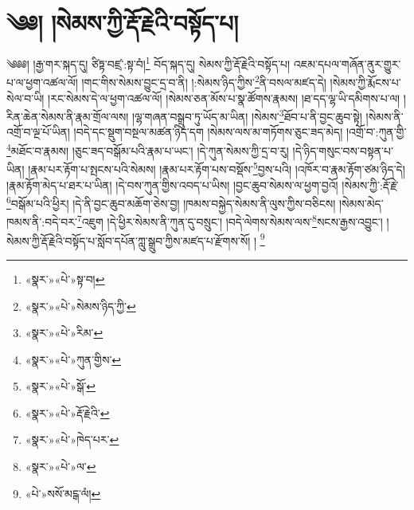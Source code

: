 \chapter{༄༅། །སེམས་ཀྱི་རྡོ་རྗེའི་བསྟོད་པ།}༄༅༅། །རྒྱ་གར་སྐད་དུ། ཙིཏྟ་བཛྲ་:སྟ་བཾ།\footnote{«སྣར་»«པེ་»སྟ་བ།} བོད་སྐད་དུ། སེམས་ཀྱི་རྡོ་རྗེའི་བསྟོད་པ། འཇམ་དཔལ་གཞོན་ནུར་གྱུར་པ་ལ་ཕྱག་འཚལ་ལོ། །གང་གིས་སེམས་བྱུང་དྲ་བ་ནི། །:སེམས་ཉིད་ཀྱིས་\footnote{«སྣར་»«པེ་»སེམས་ཉིད་ཀྱི་}ནི་བསལ་མཛད་དེ། །སེམས་ཀྱི་རྨོངས་པ་སེལ་བ་ཡི། །རང་སེམས་དེ་ལ་ཕྱག་འཚལ་ལོ། །སེམས་ཅན་མོས་པ་སྣ་ཚོགས་རྣམས། །ཐ་དད་ལྷ་ཡི་དམིགས་པ་ལ། །རིན་ཆེན་སེམས་ནི་རྣམ་གྲོལ་ལས། །ལྷ་གཞན་བསྒྲུབ་ཏུ་ཡོད་མ་ཡིན། །སེམས་\footnote{«སྣར་»«པེ་»རིམ་}ཐོབ་པ་ནི་བྱང་ཆུབ་སྟེ། །སེམས་ནི་འགྲོ་བ་ལྔ་པོ་ཡིན། །བདེ་དང་སྡུག་བསྔལ་མཚན་ཉིད་དག །སེམས་ལས་མ་གཏོགས་ཅུང་ཟད་མེད། །འགྲོ་བ་:ཀུན་གྱི་\footnote{«སྣར་»«པེ་»ཀུན་གྱིས་}མཐོང་བ་རྣམས། །ཅུང་ཟད་བསྒོམ་པའི་རྣམ་པ་ཡང་། །དེ་ཀུན་སེམས་ཀྱི་དྲ་བ་རུ། །དེ་ཉིད་གསུང་བས་བསྟན་པ་ཡིན། །རྣམ་པར་རྟོག་པ་སྤངས་པའི་སེམས། །རྣམ་པར་རྟོག་པས་བསྡོས་\footnote{«སྣར་»«པེ་»སྒོ་}བྱས་པའི། །འཁོར་བ་རྣམ་རྟོག་ཙམ་ཉིད་དེ། །རྣམ་རྟོག་མེད་པ་ཐར་པ་ཡིན། །དེ་བས་ཀུན་གྱིས་འབད་པ་ཡིས། །བྱང་ཆུབ་སེམས་ལ་ཕྱག་བྱའོ། །སེམས་ཀྱི་:རྡོ་རྗེ་\footnote{«སྣར་»«པེ་»རྡོ་རྗེའི་}བསྒོམ་པའི་ཕྱིར། །དེ་ནི་བྱང་ཆུབ་མཆོག་ཅེས་བྱ། །ཁམས་བསྐྱེད་སེམས་ནི་ལུས་ཀྱིས་བཅིངས། །སེམས་མེད་ཁམས་ནི་:བདེ་བར་\footnote{«སྣར་»«པེ་»ཁེད་པར་}འཇུག །དེ་ཕྱིར་སེམས་ནི་ཀུན་དུ་བསྲུང་། །བདེ་ལེགས་སེམས་ལས་\footnote{«སྣར་»«པེ་»ལ་}སངས་རྒྱས་འབྱུང་། །སེམས་ཀྱི་རྡོ་རྗེའི་བསྟོད་པ་སློབ་དཔོན་ཀླུ་སྒྲུབ་ཀྱིས་མཛད་པ་རྫོགས་སོ། ། \footnote{«པེ་»སསོ་མངྒ་ལཾ། }